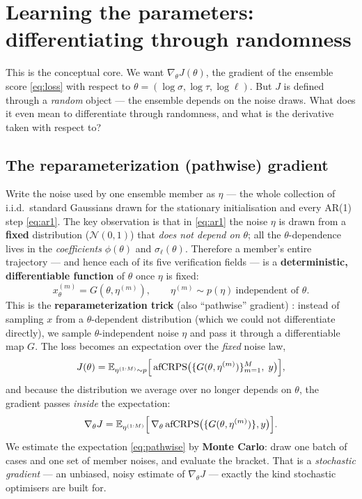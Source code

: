 \documentclass[11pt]{article}
\newcommand{\E}{\mathbb{E}}
\begin{document}
\section{Learning the parameters: differentiating through randomness}
\label{sec:learn}

This is the conceptual core. We want $\nabla_\theta J(\theta)$, the gradient of
the ensemble score \eqref{eq:loss} with respect to
$\theta=(\log\sigma,\log\tau,\log\ell)$. But $J$ is defined through a
\emph{random} object --- the ensemble depends on the noise draws. What does it even
mean to differentiate through randomness, and what is the derivative taken with
respect to?

\subsection{The reparameterization (pathwise) gradient}\label{sec:reparam}

Write the noise used by one ensemble member as $\eta$ --- the whole collection of
i.i.d.\ standard Gaussians drawn for the stationary initialisation and every AR(1)
step \eqref{eq:ar1}. The key observation is that in \eqref{eq:ar1} the noise
$\eta$ is drawn from a \textbf{fixed} distribution ($\mathcal N(0,1)$) that
\emph{does not depend on $\theta$}; all the $\theta$-dependence lives in the
\emph{coefficients} $\phi(\theta)$ and $\sigma_\ell(\theta)$. Therefore a member's
entire trajectory --- and hence each of its five verification fields --- is a
\textbf{deterministic, differentiable function} of $\theta$ once $\eta$ is fixed:
\begin{equation}
  x^{(m)}_\theta = G(\theta, \eta^{(m)}),
  \qquad \eta^{(m)}\sim p(\eta)\ \text{independent of }\theta .
\end{equation}
This is the \textbf{reparameterization trick} (also ``pathwise'' gradient)
\citep{kingma2014,mohamed2020}: instead of sampling $x$ from a
$\theta$-dependent distribution (which we could not differentiate directly), we
sample $\theta$-independent noise $\eta$ and pass it through a differentiable map
$G$. The loss becomes an expectation over the \emph{fixed} noise law,
\begin{equation}
  J(\theta) = \E_{\eta^{(1:M)}\sim p}
     \Bigl[\, \mathrm{afCRPS}\bigl(\{G(\theta,\eta^{(m)})\}_{m=1}^M,\; y\bigr)\Bigr],
\end{equation}
and because the distribution we average over no longer depends on $\theta$, the
gradient passes \emph{inside} the expectation:
\begin{equation}
  \nabla_\theta J
   = \E_{\eta^{(1:M)}}\Bigl[\, \nabla_\theta\,
       \mathrm{afCRPS}\bigl(\{G(\theta,\eta^{(m)})\}, y\bigr)\Bigr].
  \label{eq:pathwise}
\end{equation}
We estimate the expectation \eqref{eq:pathwise} by \textbf{Monte Carlo}: draw one
batch of cases and one set of member noises, and evaluate the bracket. That is a
\emph{stochastic gradient} --- an unbiased, noisy estimate of $\nabla_\theta J$ ---
exactly the kind stochastic optimisers are built for.
\end{document}
